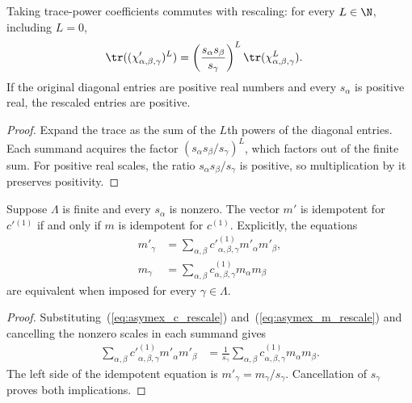 \begin{theorem}
    \label{thm:asymex_rescale_trace}
    \leanok
    Taking trace-power coefficients commutes with rescaling: for every
    $L\in\N$, including $L=0$,
    \begin{align}
        \tr((\chi'_{\alpha,\beta,\gamma})^L)
         & =
        \left(\frac{s_\alpha s_\beta}{s_\gamma}\right)^L
        \tr(\chi_{\alpha,\beta,\gamma}^L).
    \end{align}
    If the original diagonal entries are positive real numbers and
    every $s_\alpha$ is positive real, the rescaled entries are positive.
\end{theorem}
\begin{proof}
    \leanok
    Expand the trace as the sum of the $L$th powers of the diagonal
    entries. Each summand acquires the factor
    $(s_\alpha s_\beta/s_\gamma)^L$, which factors out of the finite
    sum. For positive real scales, the ratio
    $s_\alpha s_\beta/s_\gamma$ is positive, so multiplication by it
    preserves positivity.
\end{proof}

\begin{theorem}
    \label{thm:asymex_rescale_idempotent}
    \leanok
    Suppose $\Lambda$ is finite and every $s_\alpha$ is nonzero.
    The vector $m'$ is idempotent for $c'{}^{(1)}$ if and only if
    $m$ is idempotent for $c^{(1)}$. Explicitly, the equations
    \begin{align}
        m'_\gamma
         & =\sum_{\alpha,\beta}
        c'{}_{\alpha,\beta,\gamma}^{(1)}m'_\alpha m'_\beta,
        \\
        m_\gamma
         & =\sum_{\alpha,\beta}
        c_{\alpha,\beta,\gamma}^{(1)}m_\alpha m_\beta
    \end{align}
    are equivalent when imposed for every $\gamma\in\Lambda$.
\end{theorem}
\begin{proof}
    \leanok
    Substituting~(\ref{eq:asymex_c_rescale})
    and~(\ref{eq:asymex_m_rescale}) and cancelling the nonzero
    scales in each summand gives
    \begin{align}
        \sum_{\alpha,\beta}
        c'{}_{\alpha,\beta,\gamma}^{(1)}m'_\alpha m'_\beta
         & =
        \frac{1}{s_\gamma}
        \sum_{\alpha,\beta}
        c_{\alpha,\beta,\gamma}^{(1)}m_\alpha m_\beta.
    \end{align}
    The left side of the idempotent equation is
    $m'_\gamma=m_\gamma/s_\gamma$. Cancellation of $s_\gamma$
    proves both implications.
\end{proof}


